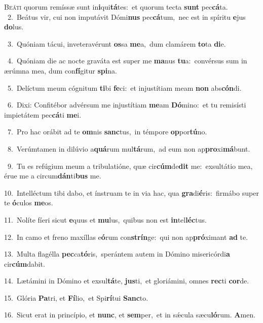 \lettrine{\initial\textcolor{\initialcolor}{B}}{eáti} quorum remíssæ sunt in\-\textbf{i}\-qui\-\textbf{tá}\-tes:~\star et quorum tecta \textbf{sunt} pec\-\textbf{cá}\-ta.\\
{\numbfont\textcolor{\numbcolor}{~2.}}~Beátus vir, cui non imputávit Dómi\textbf{nus} pec\-\textbf{cá}\-tum,~\star nec est in spíritu \textbf{e}\-jus \textbf{do}\-lus.\par
{\numbfont\textcolor{\numbcolor}{~3.}}~Quóniam tácui, inveteravérunt \textbf{os}\-sa \textbf{me}\-a,~\star dum clamárem \textbf{to}\-ta \textbf{di}\-e.\par
{\numbfont\textcolor{\numbcolor}{~4.}}~Quóniam die ac nocte graváta est super me \textbf{ma}\-nus \textbf{tu}\-a:~\star convérsus sum in ærúmna mea, dum con\-\textbf{fí}\-gitur \textbf{spi}\-na.\par
{\numbfont\textcolor{\numbcolor}{~5.}}~Delíctum meum cógnitum \textbf{ti}\-bi \textbf{fe}\-ci:~\star et injustítiam meam \textbf{non} abs\-\textbf{cón}\-di.\par
{\numbfont\textcolor{\numbcolor}{~6.}}~Dixi: Confitébor advérsum me injustítiam \textbf{me}\-am \textbf{Dó}\-mino:~\star et tu remisísti impietátem pec\-\textbf{cá}\-ti \textbf{me}\-i.\par
{\numbfont\textcolor{\numbcolor}{~7.}}~Pro hac orábit ad te \textbf{om}\-nis \textbf{sanc}\-tus,~\star in témpore \textbf{op}\-por\-\textbf{tú}\-no.\par
{\numbfont\textcolor{\numbcolor}{~8.}}~Verúmtamen in dilúvio a\-\textbf{quá}\-rum mul\-\textbf{tá}\-rum,~\star ad eum non ap\-\textbf{pro}\-xi\-\textbf{má}\-bunt.\par
{\numbfont\textcolor{\numbcolor}{~9.}}~Tu es refúgium meum a tribulatióne, quæ cir\-\textbf{cúm}\-de\textbf{dit} me:~\star exsultátio mea, érue me a circum\-\textbf{dán}\-ti\textbf{bus} me.\par
{\numbfont\textcolor{\numbcolor}{10.}}~Intelléctum tibi dabo, et ínstruam te in via hac, qua \textbf{gra}\-di\-\textbf{é}\-ris:~\star firmábo super te \textbf{ó}\-culos \textbf{me}\-os.\par
{\numbfont\textcolor{\numbcolor}{11.}}~Nolíte fíeri sicut \textbf{e}\-quus et \textbf{mu}\-lus,~\star quibus non est \textbf{in}\-tel\-\textbf{léc}\-tus.\par
{\numbfont\textcolor{\numbcolor}{12.}}~In camo et freno maxíllas e\-\textbf{ó}\-rum con\-\textbf{strín}\-ge:~\star qui non ap\-\textbf{pró}\-ximant \textbf{ad} te.\par
{\numbfont\textcolor{\numbcolor}{13.}}~Multa flagélla \textbf{pec}\-ca\-\textbf{tó}\-ris,~\star sperántem autem in Dómino misericórdi\textbf{a} cir\-\textbf{cúm}\-dabit.\par
{\numbfont\textcolor{\numbcolor}{14.}}~Lætámini in Dómino et exsul\-\textbf{tá}\-te, \textbf{jus}\-ti,~\star et gloriámini, omnes \textbf{rec}\-ti \textbf{cor}\-de.\par
{\numbfont\textcolor{\numbcolor}{15.}}~Glória \textbf{Pa}\-tri, et \textbf{Fí}\-lio,~\star et Spi\-\textbf{rí}\-tui \textbf{Sanc}\-to.\par
{\numbfont\textcolor{\numbcolor}{16.}}~Sicut erat in princípio, et \textbf{nunc}\-, et \textbf{sem}\-per,~\star et in sǽcula sæcu\-\textbf{ló}\-rum. \textbf{A}\-men.\par
